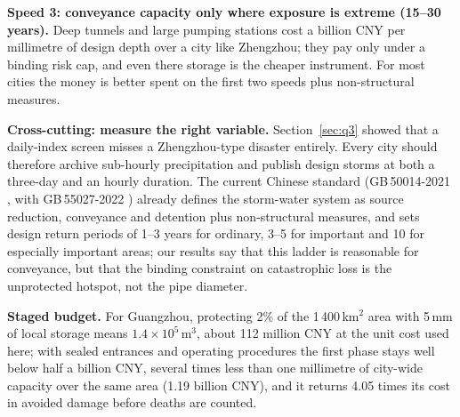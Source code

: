 \textbf{Speed 3: conveyance capacity only where exposure is extreme (15--30 years).} Deep tunnels and large pumping stations cost a billion CNY per millimetre of design depth over a city like Zhengzhou; they pay only under a binding risk cap, and even there storage is the cheaper instrument. For most cities the money is better spent on the first two speeds plus non-structural measures.

\textbf{Cross-cutting: measure the right variable.} Section~\ref{sec:q3} showed that a daily-index screen misses a Zhengzhou-type disaster entirely. Every city should therefore archive sub-hourly precipitation and publish design storms at both a three-day and an hourly duration. The current Chinese standard (GB\,50014-2021 \cite{gb50014}, with GB\,55027-2022 \cite{gb55027}) already defines the storm-water system as source reduction, conveyance and detention plus non-structural measures, and sets design return periods of 1--3 years for ordinary, 3--5 for important and 10 for especially important areas; our results say that this ladder is reasonable for conveyance, but that the binding constraint on catastrophic loss is the unprotected hotspot, not the pipe diameter.

\textbf{Staged budget.} For Guangzhou, protecting 2\% of the 1\,400\,km$^2$ area with 5\,mm of local storage means $1.4\times10^{5}$\,m$^3$, about 112 million CNY at the unit cost used here; with sealed entrances and operating procedures the first phase stays well below half a billion CNY, several times less than one millimetre of city-wide capacity over the same area (1.19 billion CNY), and it returns 4.05 times its cost in avoided damage before deaths are counted.
